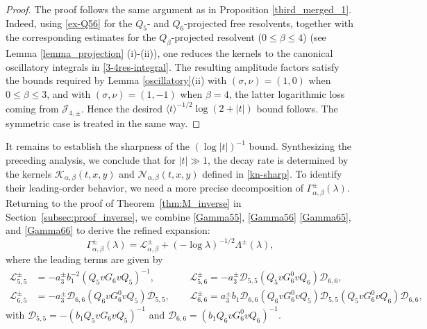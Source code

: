 \documentclass[reqno]{amsart}
\numberwithin{equation}{section}
\begin{document}
\begin{proof}
The proof follows the same argument as in Proposition
\ref{third_merged_1}. Indeed, using \eqref{ex-Q56} for the
$Q_5$- and $Q_6$-projected free resolvents, together with the
corresponding estimates for the $Q_\beta$-projected resolvent
($0\leq\beta\leq4$) (see Lemma \ref{lemma_projection} (i)-(ii)), one reduces the kernels to the canonical
oscillatory integrals in \eqref{3-4res-integral}. The resulting
amplitude factors satisfy the bounds required by Lemma
\ref{oscillatory}(ii) with $(\sigma,\nu)=(1,0)$ when
$0\leq\beta\leq3$, and with $(\sigma,\nu)=(1,-1)$ when
$\beta=4$, the latter logarithmic loss coming from
$\mathcal J_{4,\pm}$. Hence the desired
$\langle t\rangle^{-1/2}\log(2+|t|)$ bound follows. The symmetric case is treated in the same way.
\end{proof}







	It remains to establish the sharpness of the $(\log|t|)^{-1}$ bound.
	Synthesizing the preceding analysis, we conclude that for $|t|\gg 1$, 
the decay rate is determined by the kernels $\mathcal{K}_{\alpha,\beta}(t,x,y)$ and $\mathcal{N}_{\alpha,\beta}(t,x,y)$ defined in \eqref{kn-sharp}.
	To identify their leading-order behavior, we need
	a more precise decomposition of
	\(\Gamma_{\alpha,\beta}^\pm(\lambda)\).    Returning to the proof of Theorem~\ref{thm:M_inverse} in Section~\ref{subsec:proof_inverse}, we combine \eqref{Gamma55}, \eqref{Gamma56} \eqref{Gamma65}, and \eqref{Gamma66}
	to derive the refined expansion:  
	\[    
	\Gamma_{\alpha,\beta}^{\pm}(\lambda) = \mathcal{L}_{\alpha,\beta}^\pm + (-\log \lambda)^{-1/2} \Lambda^\pm(\lambda),
	\]    
where the leading terms are given by  
	\begin{equation}\label{mathcal_L} 
		\begin{aligned}  
			\mathcal{L}_{5,5}^{\pm} &= -a_3^\pm b_1^{-2}(Q_5 v G_6 v Q_5)^{-1}, \ \  
			&&\mathcal{L}_{5,6}^{\pm} = -a_3^\pm \mathcal{D}_{5,5} (Q_5 v G_6^0 v Q_6) \mathcal{D}_{6,6}, \\  
			\mathcal{L}_{6,5}^{\pm} &= -a_3^\pm \mathcal{D}_{6,6} (Q_6 v G_6^0 v Q_5) \mathcal{D}_{5,5}, \ \  
			&&\mathcal{L}_{6,6}^{\pm} = a_3^\pm b_1 \mathcal{D}_{6,6} (Q_6 v G_6^0 v Q_5) \mathcal{D}_{5,5} (Q_5 v G_6^0 v Q_6) \mathcal{D}_{6,6},  
		\end{aligned}  
	\end{equation}  
	with $\mathcal{D}_{5,5} = -(b_1 Q_5 v G_6 v Q_5)^{-1}$ and $\mathcal{D}_{6,6} = (b_1 Q_6 v G_6^0 v Q_6)^{-1}$.
	
\end{document}
